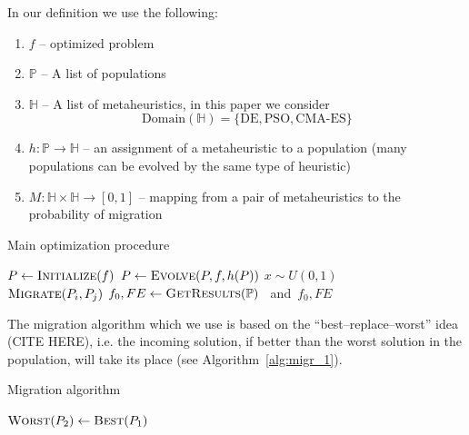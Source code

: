 \documentclass{sig-alternate}
\begin{document}
In our definition we use the following:
\begin{enumerate}
    \item $f$ -- optimized problem
    \item $\mathbb{P}$ -- A list of populations%
    \item $\mathbb{H}$ -- A list of metaheuristics, in this paper we consider
        $$\mbox{Domain}(\mathbb{H}) = \{\mbox{DE}, \mbox{PSO}, \mbox{CMA-ES}\}$$
    \item $h: \mathbb{P} \rightarrow \mathbb{H}$ -- an assignment of a metaheuristic to a population (many populations can be evolved by the same type of heuristic)
    \item $M: \mathbb{H} \times \mathbb{H} \rightarrow [0, 1]$ -- mapping from a pair of metaheuristics to the probability of migration%

\end{enumerate}

\begin{algorithm}
\caption{Main optimization procedure}
\label{alg:main_loop}
\begin{algorithmic}[1]
        \State $P \gets \Call{Initialize}{f}$
    \EndFor
    \Do
            \State $P \gets \Call{Evolve}{P, f, h(P)}$
        \EndFor
            \State $x \sim U(0,1)$
            \\
                \State $\Call{Migrate}{P_i, P_j}$
            \EndIf
        \EndFor
        \State $f_0, FE \gets \Call{GetResults}{\mathbb{P}}$
\EndProcedure \mbox{ and }\Return $f_0, FE$
\end{algorithmic}
\end{algorithm}
The migration algorithm which we use is based on the ``best--replace--worst'' idea (CITE HERE), i.e. the incoming solution, if better than the worst solution in the population, will take its place (see Algorithm~\ref{alg:migr_1}).
\begin{algorithm}
\caption{Migration algorithm}
\label{alg:migr_1}
\begin{algorithmic}[1]
        \State $\Call{Worst}{P_2} \gets \Call{Best}{P_1}$
    \EndIf
\EndProcedure
\end{algorithmic}
\end{algorithm}
\end{document}
